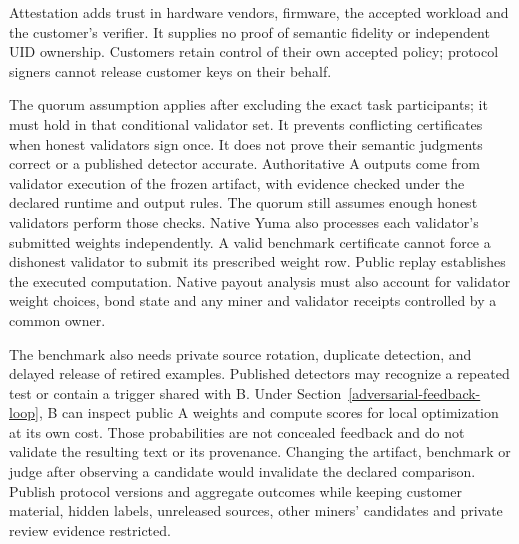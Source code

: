 Attestation adds trust in hardware vendors, firmware, the accepted workload
and the customer's verifier. It supplies no proof of semantic fidelity or
independent UID ownership. Customers retain control of their own accepted
policy; protocol signers cannot release customer keys on their behalf.

The quorum assumption applies after excluding the exact task participants;
it must hold in that conditional validator set. It prevents conflicting
certificates when honest validators sign once. It does not prove their
semantic judgments correct or a published detector accurate. Authoritative
A outputs come from validator execution of the frozen artifact, with
evidence checked under the declared runtime and output rules. The quorum
still assumes enough honest validators perform those checks. Native Yuma
also processes each validator's
submitted weights independently. A valid benchmark certificate cannot
force a dishonest validator to submit its prescribed weight row. Public
replay establishes the executed computation. Native payout analysis must also account
for validator weight choices, bond state and any miner and validator
receipts controlled by a common owner.

The benchmark also needs private source rotation, duplicate detection,
and delayed release of retired examples. Published detectors may recognize
a repeated test or contain a trigger shared with B. Under
Section~\ref{adversarial-feedback-loop}, B can inspect public A weights and
compute scores for local optimization at its own cost. Those probabilities
are not concealed feedback and do not validate the resulting text or its
provenance. Changing the artifact, benchmark or
judge after observing a candidate would invalidate the declared comparison. Publish
protocol versions and aggregate outcomes while keeping customer material,
hidden labels, unreleased sources, other miners' candidates and private
review evidence restricted.


